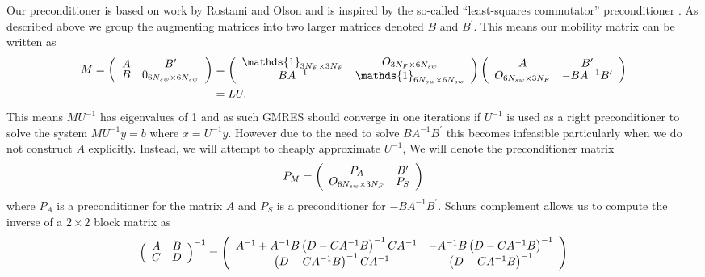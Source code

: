 Our preconditioner is based on work by Rostami and Olson \cite{Rostami2019FastBiofluids} and is inspired by the so-called “least-squares commutator” preconditioner \cite{Elman2005FiniteDynamics}. As described above we group the augmenting matrices into two larger matrices denoted $B$ and $B^\prime$. This means our mobility matrix can be written as 
\begin{equation*}
\begin{aligned}
\def\arraystretch{0.8}
    M = \left(\begin{array}{cc}
        A & B^\prime \\
        B & 0_{6N_{sw}\times6N_{sw}} 
    \end{array}\right) &= 
    \left(\begin{array}{cc}
        \mathds{1}_{3N_F \times 3N_F} & O_{3N_F\times6N_{sw}} \\
        BA^{-1} & \mathds{1}_{6N_{sw} \times 6N_{sw}}
    \end{array}\right)
    \left(\begin{array}{cc}
        A & B^\prime \\
        O_{6N_{sw}\times3N_F} & -BA^{-1}B^\prime
    \end{array}\right) \\
    &= LU.
\end{aligned}
\end{equation*}
This means $MU^{-1}$ has eigenvalues of 1 and as such GMRES should converge in one iterations \cite{Rostami2019FastBiofluids} if $U^{-1}$ is used as a right preconditioner to solve the system $MU^{-1}y = b$ where $x = U^{-1}y$. However due to the need to solve $BA^{-1}B^\prime$ this becomes infeasible particularly when we do not construct $A$ explicitly.  Instead, we will attempt to cheaply approximate $U^{-1}$, We will denote the preconditioner matrix 
\begin{equation}
\def\arraystretch{0.8}
    P_M = \left(\begin{array}{cc}
        P_A & B^\prime \\
        O_{6N_{sw}\times3N_F} & P_S
    \end{array}\right)
    \label{eq:Precon}
\end{equation}
where $P_A$ is a preconditioner for the matrix $A$ and $P_S$ is a preconditioner for $-BA^{-1}B^\prime$. Schurs complement \cite{Zhang2005TheApplications,Lu2002InversesMatrices} allows us to compute the inverse of a $2 \times 2$ block matrix as 
\begin{equation*}
\def\arraystretch{0.8}
    \left(\begin{array}{cc}
        A & B \\
        C & D
    \end{array}\right)^{-1} = \left(\begin{array}{cc}
A^{-1}+A^{-1} B\left(D-C A^{-1} B\right)^{-1} C A^{-1} & -A^{-1} B\left(D-C A^{-1} B\right)^{-1} \\
-\left(D-C A^{-1} B\right)^{-1} C A^{-1} & \left(D-C A^{-1} B\right)^{-1}
\end{array}\right) 
\end{equation*}
